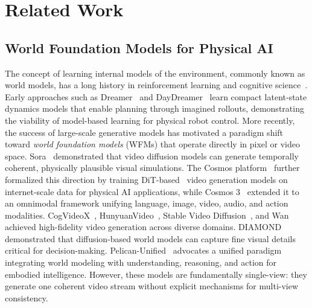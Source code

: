 \section{Related Work}
\label{sec:related-work}

\subsection{World Foundation Models for Physical AI}

The concept of learning internal models of the environment, commonly known as world models, has a long history in reinforcement learning and cognitive science~\cite{ha2018world}. Early approaches such as Dreamer~\cite{hafner2020dreamer} and DayDreamer~\cite{wu2023daydreamer} learn compact latent-state dynamics models that enable planning through imagined rollouts, demonstrating the viability of model-based learning for physical robot control. More recently, the success of large-scale generative models has motivated a paradigm shift toward \emph{world foundation models} (WFMs) that operate directly in pixel or video space. Sora~\cite{liu2024sora} demonstrated that video diffusion models can generate temporally coherent, physically plausible visual simulations. The Cosmos platform~\cite{nvidia2025cosmos} further formalized this direction by training DiT-based~\cite{peebles2023dit} video generation models on internet-scale data for physical AI applications, while Cosmos 3~\cite{nvidia2026cosmos3} extended it to an omnimodal framework unifying language, image, video, audio, and action modalities. CogVideoX~\cite{yang2024cogvideox}, HunyuanVideo~\cite{kong2024hunyuanvideo}, Stable Video Diffusion~\cite{blattmann2023svd}, and Wan~\cite{wan2025wan} achieved high-fidelity video generation across diverse domains. DIAMOND~\cite{alonso2024diamond} demonstrated that diffusion-based world models can capture fine visual details critical for decision-making. Pelican-Unified~\cite{zhang2026pelican} advocates a unified paradigm integrating world modeling with understanding, reasoning, and action for embodied intelligence. However, these models are fundamentally single-view: they generate one coherent video stream without explicit mechanisms for multi-view consistency.

